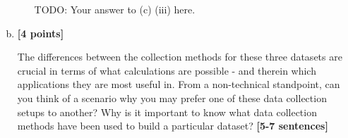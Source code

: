\begin{enumerate}[(a)]
\begin{enumerate}[(i)]
\begin{tcolorbox}[colback=white!5!white,colframe=green!75!black]
{{            TODO: Your answer to (c) (iii) here.
                
            }}
    \end{tcolorbox}
\end{enumerate}
\item \textbf{[4 points]}
\begin{tcolorbox}[colback=orange!5!white,colframe=orange!75!black] 
The differences between the collection methods for these three datasets are crucial in terms of what calculations are possible - and therein which applications they are most useful in. From a non-technical standpoint, can you think of a scenario why you may prefer one of these data collection setups to another? Why is it important to know what data collection methods have been used to build a particular dataset? \textbf{[5-7 sentences]}
\end{tcolorbox}
\end{enumerate}










